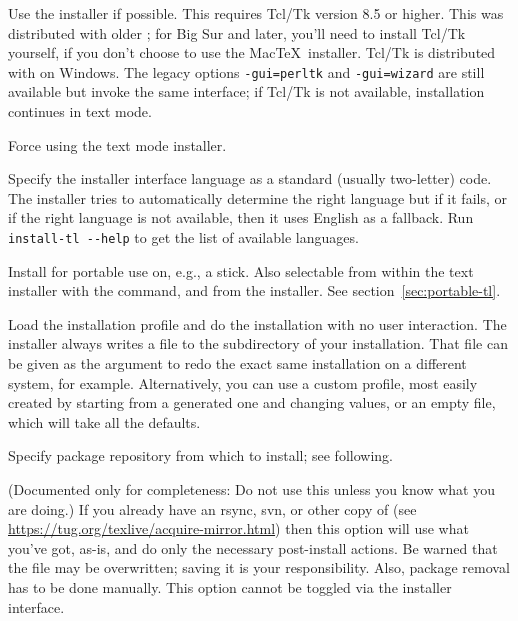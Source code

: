 \documentclass[12pt]{article}
\begin{document}
\begin{ttdescription}
\item[-gui] Use the \GUI{} installer if possible. This requires
  Tcl/Tk version 8.5 or higher. This was distributed with older \macOS;
  for Big Sur and later, you'll need to install Tcl/Tk yourself, if you
  don't choose to use the Mac\TeX\ installer. Tcl/Tk is
  distributed with \TL{} on Windows. The legacy options
  \texttt{-gui=perltk} and \texttt{-gui=wizard} are still available
  but invoke the same \GUI{} interface; if Tcl/Tk is not available,
  installation continues in text mode.

\item[-no-gui] Force using the text mode installer.

\item[-lang {\sl LL}] Specify the installer interface
  language as a standard (usually two-letter) code.  The installer tries
  to automatically determine the right language but if it fails, or if
  the right language is not available, then it uses English as a
  fallback.  Run \verb|install-tl --help| to get the list of available
  languages.

\item[-portable] Install for portable use on, e.g., a \USB{} stick.
  Also selectable from within the text installer with the 
  command, and from the \GUI{} installer.  See
  section~\ref{sec:portable-tl}.

\item[-profile {\sl file}] Load the installation profile  and
  do the installation with no user interaction.  The installer always
  writes a file  to the 
  subdirectory of your installation.  That file can be given as the
  argument to redo the exact same installation on a different system,
  for example.  Alternatively, you can use a custom profile, most easily
  created by starting from a generated one and changing values, or an
  empty file, which will take all the defaults.

\item [-repository {\sl url-or-directory}] Specify package
  repository from which to install; see following.

\item[-in-place] (Documented only for completeness: Do not use this
  unless you know what you are doing.) If you already have an rsync, svn,
  or other copy of \TL{} (see
  \url{https://tug.org/texlive/acquire-mirror.html}) then this option
  will use what you've got, as-is, and do only the necessary
  post-install actions.  Be warned that the file 
  may be overwritten; saving it is your responsibility.  Also, package
  removal has to be done manually. This option cannot be toggled via the
  installer interface.
\end{ttdescription}
\end{document}
